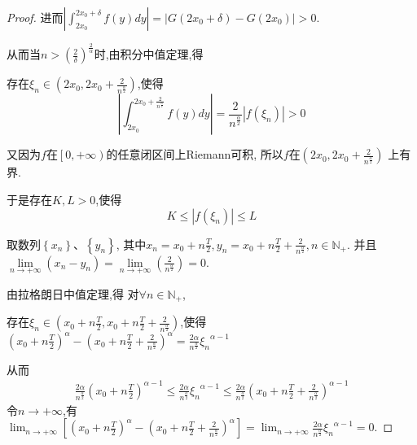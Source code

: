 \documentclass[lang=cn,newtx,10pt,scheme=chinese]{../Template/elegantbook}
\begin{document}
\begin{proof}
进而$\left| \int_{2x_0}^{2x_0+\delta}{f\left( y \right) dy} \right|=\left| G\left( 2x_0+\delta \right) -G\left( 2x_0 \right) \right|>0$.

从而当$n>\left( \frac{2}{\delta} \right) ^{\frac{2}{\alpha}}$时,由积分中值定理,得

存在$\xi _n\in \left( 2x_0,2x_0+\frac{2}{n^{\frac{\alpha}{2}}} \right) $,使得
\begin{equation}\label{A}
\left| \int_{2x_0}^{2x_0+\frac{2}{n^{\frac{\alpha}{2}}}}{f\left( y \right) dy} \right|=\frac{2}{n^{\frac{\alpha}{2}}}\left| f\left( \xi _n \right) \right|>0
\end{equation}

又因为$f$在$\left[ 0,+\infty \right)$的任意闭区间上Riemann可积,
所以$f$在$\left( 2x_0,2x_0+\frac{2}{n^{\frac{\alpha}{2}}} \right) $
上有界.

于是存在$K,L> 0$,使得
\begin{equation}\label{B}
K\leqslant \left| f\left( \xi _n \right) \right|\leqslant L
\end{equation}

取数列$\left\{ x_n \right\} \text{、}\left\{ y_n \right\} $,
其中$x_n=x_0+n\frac{T}{2},y_n=x_0+n\frac{T}{2}+\frac{2}{n^{\frac{\alpha}{2}}},n\in \mathbb{N} _+$.
并且$\underset{n\rightarrow +\infty}{\lim}\left( x_n-y_n \right) =\underset{n\rightarrow +\infty}{\lim}\left( \frac{2}{n^{\frac{\alpha}{2}}} \right) =0$.

由拉格朗日中值定理,得
对$\forall n\in \mathbb{N} _+$,

存在$\xi _n\in \left( x_0+n\frac{T}{2},x_0+n\frac{T}{2}+\frac{2}{n^{\frac{\alpha}{2}}} \right) $,使得
$\left( x_0+n\frac{T}{2} \right) ^{\alpha}-\left( x_0+n\frac{T}{2}+\frac{2}{n^{\frac{\alpha}{2}}} \right) ^{\alpha}=\frac{2\alpha}{n^{\frac{\alpha}{2}}}{\xi _n}^{\alpha -1}$

从而
\begin{equation}
\begin{split}
\frac{2\alpha}{n^{\frac{\alpha}{2}}}\left( x_0+n\frac{T}{2} \right) ^{\alpha -1}\leqslant \frac{2\alpha}{n^{\frac{\alpha}{2}}}{\xi _n}^{\alpha -1}\leqslant \frac{2\alpha}{n^{\frac{\alpha}{2}}}\left( x_0+n\frac{T}{2}+\frac{2}{n^{\frac{\alpha}{2}}} \right) ^{\alpha -1}
\end{split}
\nonumber
\end{equation}
令$n\rightarrow +\infty$,有$\lim_{n\rightarrow +\infty} \left[ \left( x_0+n\frac{T}{2} \right) ^{\alpha}-\left( x_0+n\frac{T}{2}+\frac{2}{n^{\frac{\alpha}{2}}} \right) ^{\alpha} \right] =\lim_{n\rightarrow +\infty} \frac{2\alpha}{n^{\frac{\alpha}{2}}}{\xi _n}^{\alpha -1}=0$.


\end{proof}
\end{document}
